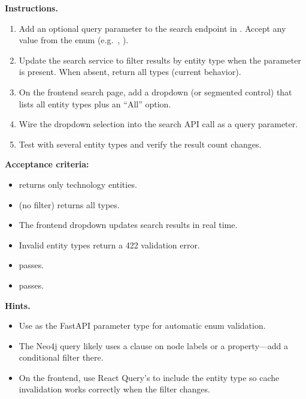 \medskip\noindent\textbf{Instructions.}

\begin{enumerate}
    \item Add an optional  query parameter to the search
          endpoint in .  Accept any value from
          the  enum (e.g.\ , ).
    \item Update the search service to filter results by entity type when
          the parameter is present.  When absent, return all types (current
          behavior).
    \item On the frontend search page, add a dropdown (or segmented
          control) that lists all entity types plus an ``All'' option.
    \item Wire the dropdown selection into the search API call as a query
          parameter.
    \item Test with several entity types and verify the result count
          changes.
\end{enumerate}

\begin{tryit}
\textbf{Acceptance criteria:}
\begin{itemize}
    \item {} returns
          only technology entities.
    \item {} (no filter) returns all types.
    \item The frontend dropdown updates search results in real time.
    \item Invalid entity types return a 422 validation error.
    \item {} passes.
    \item {} passes.
\end{itemize}
\end{tryit}

\medskip\noindent\textbf{Hints.}

\begin{itemize}
    \item Use  as the FastAPI parameter
          type for automatic enum validation.
    \item The Neo4j query likely uses a  clause on node labels
          or a  property---add a conditional filter there.
    \item On the frontend, use React Query's  to include the
          entity type so cache invalidation works correctly when the filter
          changes.
\end{itemize}


